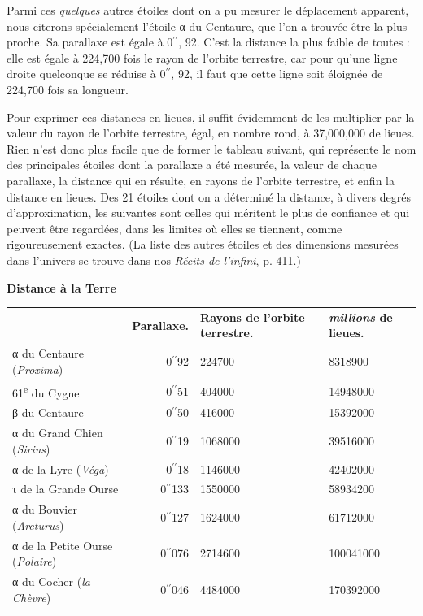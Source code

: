 \documentclass[a4paper, 11pt, oneside]{article}
\begin{document}
Parmi ces \emph{quelques} autres étoiles dont on a pu mesurer le déplacement apparent, nous citerons spécialement l'étoile α du Centaure, que l'on a trouvée être la plus proche. Sa parallaxe est égale à 0$^{\prime\prime}$, 92. C'est la distance la plus faible de toutes : elle est égale à 224,700 fois le rayon de l'orbite terrestre, car pour qu'une ligne droite quelconque se réduise à 0$^{\prime\prime}$, 92, il faut que cette ligne soit éloignée de 224,700 fois sa longueur.

Pour exprimer ces distances en lieues, il suffit évidemment de les multiplier par la valeur du rayon de l'orbite terrestre, égal, en nombre rond, à 37,000,000 de lieues. Rien n'est donc plus facile que de former le tableau suivant, qui représente le nom des principales étoiles dont la parallaxe a été mesurée, la valeur de chaque parallaxe, la distance qui en résulte, en rayons de l'orbite terrestre, et enfin la distance en lieues. Des 21 étoiles dont on a déterminé la distance, à divers degrés d'approximation, les suivantes sont celles qui méritent le plus de confiance et qui peuvent être regardées, dans les limites où elles se tiennent, comme rigoureusement exactes. (La liste des autres étoiles et des dimensions mesurées dans l'univers se trouve dans nos \emph{Récits de l'infini}, p. 411.)
\begin{center}
\textbf{Distance à la Terre}
\end{center}
\begin{table}[H]
    \centering
    \footnotesize
    \Fontauri
    \begin{tabular}{l r p{20mm} p{20mm}}
        ~ & \textbf{Parallaxe.} & \textbf{Rayons de l'orbite terrestre.} & \textbf{\emph{millions} de lieues.} \\
        α du Centaure (\emph{Proxima}) & 0$^{\prime\prime}$92 & 224700 & 8318900 \\
        61\textsuperscript{e} du Cygne & 0$^{\prime\prime}$51 & 404000 & 14948000 \\
        β du Centaure & 0$^{\prime\prime}$50 & 416000 & 15392000 \\
        α du Grand Chien (\emph{Sirius}) & 0$^{\prime\prime}$19 & 1068000 & 39516000 \\
        α de la Lyre (\emph{Véga}) & 0$^{\prime\prime}$18 & 1146000 & 42402000 \\
        τ de la Grande Ourse & 0$^{\prime\prime}$133 & 1550000 & 58934200 \\
        α du Bouvier (\emph{Arcturus}) & 0$^{\prime\prime}$127 & 1624000 & 61712000 \\
        α de la Petite Ourse (\emph{Polaire}) & 0$^{\prime\prime}$076 & 2714600 & 100041000 \\
        α du Cocher (\emph{la Chèvre}) & 0$^{\prime\prime}$046 & 4484000 & 170392000 \\
    \end{tabular}
\end{table}
\clearpage
\end{document}
